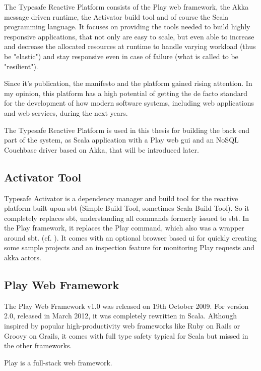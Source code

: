 The Typesafe Reactive Platform consists of the Play web framework, the Akka message driven runtime, the Activator build tool and of course the Scala programming language. It focuses on providing the tools needed to build highly responsive applications, that not only are easy to scale, but even able to increase and decrease the allocated resources at runtime to handle varying workload (thus be "elastic") and stay responsive even in case of failure (what is called to be "resilient").

Since it's publication, the manifesto and the platform gained rising attention. In my opinion, this platform has a high potential of getting the de facto standard for the development of how modern software systems, including web applications and web services, during the next years.

The Typesafe Reactive Platform is used in this thesis for building the back end part of the system, as Scala application with a Play web gui and an NoSQL Couchbase driver based on Akka, that will be introduced later. %

\subsection{Activator Tool}

Typesafe Activator is a dependency manager and build tool for the reactive platform built upon sbt (Simple Build Tool, sometimes Scala Build Tool). So it completely replaces sbt, understanding all commands formerly issued to sbt. In the Play framework, it replaces the Play command, which also was a wrapper around sbt. (cf. \cite{typesafeact}). It comes with an optional browser based ui for quickly creating some sample projects and an inspection feature for monitoring Play requests and akka actors. 

\subsection{Play Web Framework}
\label{sec:play}

The Play Web Framework v1.0 was released on 19th October 2009. For version 2.0, released in March 2012, it was completely rewritten in Scala.
Although inspired by popular high-productivity web frameworks like Ruby on Rails or Groovy on Grails, it comes with full type safety typical for Scala but missed in the other frameworks.

Play is a full-stack web framework.

